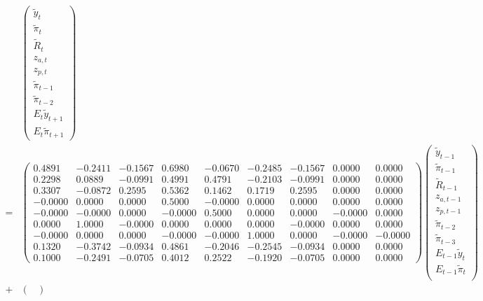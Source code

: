 \documentclass{article}
\begin{document}
\begin{CJK}{UTF8}{min}
\begin{align*}
&\begin{pmatrix}
\tilde y_t\\
\tilde \pi_t\\
\tilde R_t\\
z_{a,t}\\
z_{p,t}\\
\tilde \pi_{t-1}\\
\tilde \pi_{t-2}\\
E_t\tilde y_{t+1}\\
E_t\tilde \pi_{t+1}
\end{pmatrix}\\
=& \begin{pmatrix}
0.4891 & -0.2411 & -0.1567 &  0.6980 & -0.0670 & -0.2485 & -0.1567 &  0.0000 &  0.0000 \\
  0.2298 &  0.0889 & -0.0991 &  0.4991 &  0.4791 & -0.2103 & -0.0991 &  0.0000 &  0.0000 \\
  0.3307 & -0.0872 &  0.2595 &  0.5362 &  0.1462 &  0.1719 &  0.2595 &  0.0000 &  0.0000 \\
 -0.0000 &  0.0000 &  0.0000 &  0.5000 & -0.0000 &  0.0000 &  0.0000 &  0.0000 &  0.0000 \\
 -0.0000 & -0.0000 &  0.0000 & -0.0000 &  0.5000 &  0.0000 &  0.0000 & -0.0000 &  0.0000 \\
  0.0000 &  1.0000 & -0.0000 &  0.0000 &  0.0000 &  0.0000 & -0.0000 &  0.0000 &  0.0000 \\
 -0.0000 &  0.0000 &  0.0000 & -0.0000 & -0.0000 &  1.0000 &  0.0000 & -0.0000 & -0.0000 \\
  0.1320 & -0.3742 & -0.0934 &  0.4861 & -0.2046 & -0.2545 & -0.0934 &  0.0000 &  0.0000 \\
  0.1000 & -0.2491 & -0.0705 &  0.4012 &  0.2522 & -0.1920 & -0.0705 &  0.0000 &  0.0000
\end{pmatrix}
 \begin{pmatrix}
\tilde y_{t-1}\\
\tilde \pi_{t-1}\\
\tilde R_{t-1}\\
z_{a,t-1}\\
z_{p,t-1}\\
\tilde \pi_{t-2}\\
\tilde \pi_{t-3}\\
E_{t-1}\tilde y_t\\
E_{t-1}\tilde \pi_t\\
 \end{pmatrix}\\+
 & \begin{pmatrix} 

\end{pmatrix}
\end{align*}
\end{CJK}
\end{document}
